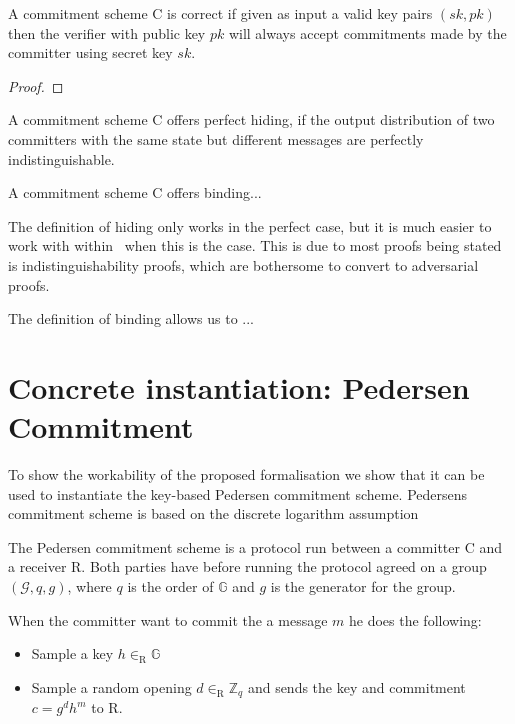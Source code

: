 \begin{lemma}
  A commitment scheme C is correct if given as input a valid key pairs
  $(sk, pk)$ then the verifier with public key $pk$ will always accept
  commitments made by the committer using secret key $sk$.
\end{lemma}
\begin{proof}

\end{proof}

\begin{definition}
  \label{def:commitment:perfect-hiding}
  A commitment scheme C offers perfect hiding, if the output distribution of two
  committers with the same state but different messages are perfectly
  indistinguishable.

\end{definition}

\begin{definition}
  \label{def:commitment:alt-binding}
  A commitment scheme C offers binding...
\end{definition}

The definition of hiding only works in the perfect case, but it is much easier
to work with within \easycrypt\  when this is the case. This is due to most
proofs being stated is indistinguishability proofs, which are bothersome to
convert to adversarial proofs.

The definition of binding allows us to ...


\section{Concrete instantiation: Pedersen Commitment}
\label{sec:label}

To show the workability of the proposed formalisation we show that it can be
used to instantiate the key-based Pedersen commitment scheme. Pedersens
commitment scheme is based on the discrete logarithm assumption


The Pedersen commitment scheme is a protocol run between a committer C and a receiver R. Both parties have before running the protocol agreed on a group $(\mathcal{G}, q, g)$, where $q$ is the order of $\mathbb{G}$ and $g$ is the generator for the group.

When the committer want to commit the a message $m$ he does the following:
\begin{itemize}
  \item Sample a key $h \in_{\text{R}} \mathbb{G}$
  \item Sample a random opening $d \in_{\text{R}} \mathbb{Z}_{q}$ and sends the key and commitment $c = g^{d}h^{m}$ to R.
\end{itemize}

